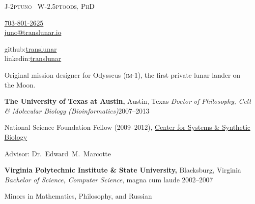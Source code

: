 \documentclass[12pt,letterpaper]{article}
\makeatletter
\def\myemail{juno@translunar.io}
\def\myphone{703-801-2625}
\newenvironment{itemize*}%
{\begin{itemize}%
  \setlength{\itemsep}{0pt}}%
{\end{itemize}}
\newcommand{\mhead}[1]{\leavevmode\marginpar{\sffamily\footnotesize #1}}
\newcommand{\rdate}[1]{{\hfill #1}}
\makeatother
\begin{document}
\flushbottom
\pagestyle{fancy} \setlength\headwidth{6.5in}
 \cfoot{}
\thispagestyle{empty}
\begin{adjustwidth}{-1in}{}
{\Huge
  {\textsc{%
    {%
    J}\kern-2ptuno~%
    {%
    W}\kern-2.5ptoods, PhD}
  }
  }
%
{
  \begin{minipage}[b]{1.3in}
    \flushleft \footnotesize   
    \href{tel:\myphone}{\myphone} \\ %
    \href{mailto:\myemail}{\myemail}
  \end{minipage}
  \hfill
  \begin{minipage}[b]{1.3in}
    \flushright \footnotesize 
    github:\href{https://github.com/translunar}{translunar} \\
    linkedin:\href{https://www.linkedin.com/in/translunar}{translunar}
  \end{minipage}
}\par
\hrulefill

\centering\small Original mission designer for Odysseus (\textsc{im}-1), the first private lunar lander on the Moon.
\vskip-6pt
\hrulefill
\end{adjustwidth}  
\reversemarginpar 
\setlength\marginparwidth{0.85in}
\smallskip

\mhead{Education}%
\textbf{The University of Texas at Austin,} Austin, Texas \newline
\emph{Doctor of Philosophy, Cell \& Molecular Biology (Bioinformatics)}\rdate{2007--2013}
\begin{itemize*}
  \item National Science Foundation Fellow (2009--2012), \href{http://cssb.utexas.edu/}{Center for Systems \& Synthetic Biology} %
  \item Advisor: Dr.~Edward~M.~Marcotte
\end{itemize*}

\medskip
\textbf{Virginia Polytechnic Institute \& State University,} Blacksburg, Virginia \newline
\emph{Bachelor of Science, Computer Science}, magna cum laude \rdate{2002--2007}
\begin{itemize*}
  \item Minors in Mathematics, Philosophy, and Russian
\end{itemize*}
\end{document}
